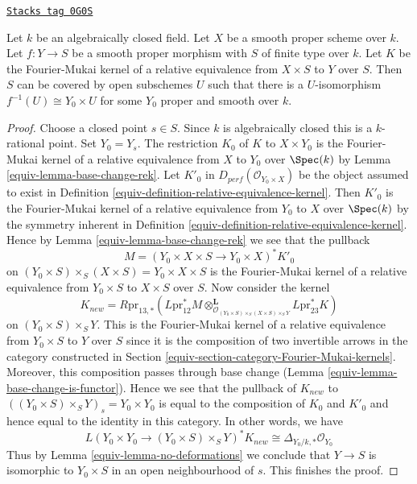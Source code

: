 \begin{lemma}
\label{equiv-lemma-no-deformations-better}
\href{https://stacks.math.columbia.edu/tag/0G0S}{\texttt{Stacks tag 0G0S}}

Let $k$ be an algebraically closed field. Let $X$
be a smooth proper scheme over $k$.
Let $f : Y \to S$ be a smooth proper morphism with $S$ of finite type over $k$.
Let $K$ be the Fourier-Mukai kernel of a relative equivalence
from $X \times S$ to $Y$ over $S$. Then $S$ can be covered by
open subschemes $U$ such that there is a $U$-isomorphism
$f^{-1}(U) \cong Y_0 \times U$ for some $Y_0$ proper and smooth over $k$.
\end{lemma}

\begin{proof}

Choose a closed point $s \in S$. Since $k$ is algebraically closed
this is a $k$-rational point. Set $Y_0 = Y_s$. The restriction
$K_0$ of $K$ to $X \times Y_0$ is the Fourier-Mukai kernel of a
relative equivalence from $X$ to $Y_0$ over $\Spec(k)$ by
Lemma \ref{equiv-lemma-base-change-rek}. Let $K'_0$ in
$D_{perf}(\mathcal{O}_{Y_0 \times X})$ be the
object assumed to
exist in Definition \ref{equiv-definition-relative-equivalence-kernel}.
Then $K'_0$ is the Fourier-Mukai kernel of a
relative equivalence from $Y_0$ to $X$ over $\Spec(k)$
by the symmetry inherent in
Definition \ref{equiv-definition-relative-equivalence-kernel}.
Hence by
Lemma \ref{equiv-lemma-base-change-rek}
we see that the pullback
$$
M = (Y_0 \times X \times S \to Y_0 \times X)^*K'_0
$$
on $(Y_0 \times S) \times_S (X \times S) = Y_0 \times X \times S$
is the Fourier-Mukai kernel of a
relative equivalence from $Y_0 \times S$ to $X \times S$ over $S$.
Now consider the kernel
$$
K_{new} =
R\text{pr}_{13, *}(L\text{pr}_{12}^*M
\otimes_{\mathcal{O}_{(Y_0 \times S) \times_S (X \times S)
\times_S Y}}^\mathbf{L}
L\text{pr}_{23}^*K)
$$
on $(Y_0 \times S) \times_S Y$. This is the Fourier-Mukai kernel of a
relative equivalence from $Y_0 \times S$ to $Y$ over $S$ since it is
the composition of two invertible arrows in
the category constructed in
Section \ref{equiv-section-category-Fourier-Mukai-kernels}.
Moreover, this composition passes through base change
(Lemma \ref{equiv-lemma-base-change-is-functor}).
Hence we see that the pullback of $K_{new}$ to
$((Y_0 \times S) \times_S Y)_s = Y_0 \times Y_0$
is equal to the composition of $K_0$ and $K'_0$
and hence equal to the identity in this category.
In other words, we have
$$
L(Y_0 \times Y_0 \to (Y_0 \times S) \times_S Y)^*K_{new}
\cong
\Delta_{Y_0/k, *}\mathcal{O}_{Y_0}
$$
Thus by Lemma \ref{equiv-lemma-no-deformations} we conclude that $Y \to S$
is isomorphic to $Y_0 \times S$ in an open neighbourhood of $s$.
This finishes the proof.
\end{proof}

